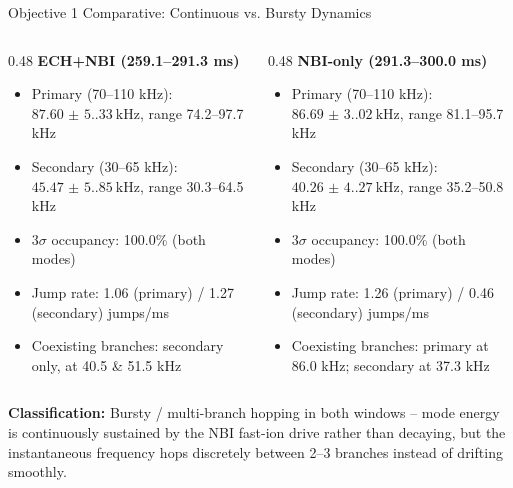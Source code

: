 \documentclass[aspectratio=169]{beamer}
\begin{document}
\begin{frame}{Objective 1 Comparative: Continuous vs. Bursty Dynamics}
    \footnotesize
    \begin{columns}[T]
        \begin{column}{0.48\textwidth}
            \textbf{ECH+NBI (259.1--291.3 ms)}
            \begin{itemize}
                \item Primary (70--110 kHz): $\SI{87.60(5.33)}{\kilo\hertz}$, range 74.2--97.7 kHz
                \item Secondary (30--65 kHz): $\SI{45.47(5.85)}{\kilo\hertz}$, range 30.3--64.5 kHz
                \item $3\sigma$ occupancy: 100.0\% (both modes)
                \item Jump rate: 1.06 (primary) / 1.27 (secondary) jumps/ms
                \item Coexisting branches: secondary only, at 40.5 \& 51.5 kHz
            \end{itemize}
        \end{column}
        \begin{column}{0.48\textwidth}
            \textbf{NBI-only (291.3--300.0 ms)}
            \begin{itemize}
                \item Primary (70--110 kHz): $\SI{86.69(3.02)}{\kilo\hertz}$, range 81.1--95.7 kHz
                \item Secondary (30--65 kHz): $\SI{40.26(4.27)}{\kilo\hertz}$, range 35.2--50.8 kHz
                \item $3\sigma$ occupancy: 100.0\% (both modes)
                \item Jump rate: 1.26 (primary) / 0.46 (secondary) jumps/ms
                \item Coexisting branches: primary at 86.0 kHz; secondary at 37.3 kHz
            \end{itemize}
        \end{column}
    \end{columns}
    \vspace{0.3cm}
    \normalsize
    \textbf{Classification:} Bursty / multi-branch hopping in both windows -- mode energy is continuously sustained by the NBI fast-ion drive rather than decaying, but the instantaneous frequency hops discretely between 2--3 branches instead of drifting smoothly.
\end{frame}
\end{document}
